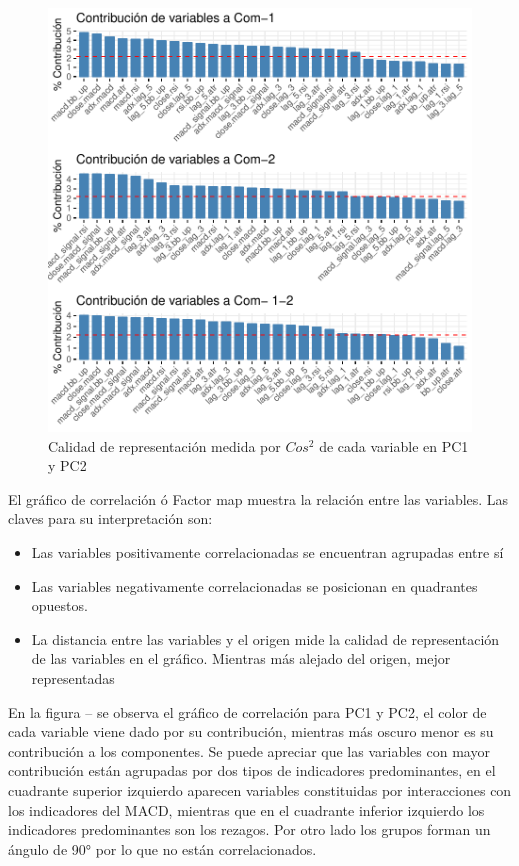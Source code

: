 \documentclass[a4paper,12pt]{Latex/Classes/PhDthesisPSnPDF}
\begin{document}
\begin{figure}[H]
\centering
\includegraphics{main-014}
\caption{Calidad de representación medida por $Cos^2$ de cada variable en PC1 y PC2}
\end{figure}

El gráfico de correlación ó Factor map muestra la relación entre las variables. Las claves para su interpretación son:

\begin{itemize}
\item Las variables positivamente correlacionadas se encuentran agrupadas entre sí
\item Las variables negativamente correlacionadas se posicionan en quadrantes opuestos.
\item La distancia entre las variables y el origen mide la calidad de representación de las variables en el gráfico. Mientras más alejado del origen, mejor representadas 
\end{itemize}

En la figura -- se observa el gráfico de correlación para PC1 y PC2, el color de cada variable viene dado por su contribución, mientras más oscuro menor es su contribución a los componentes. Se puede apreciar que las variables con mayor contribución están agrupadas por dos tipos de indicadores predominantes, en el cuadrante superior izquierdo aparecen variables constituidas por interacciones con los indicadores del MACD, mientras que en el cuadrante inferior izquierdo los indicadores predominantes son los rezagos. Por otro lado los grupos forman un ángulo de 90° por lo que no están correlacionados.
\end{document}
